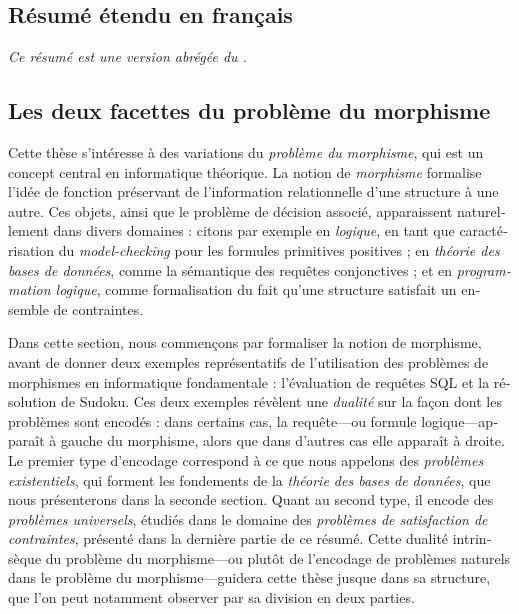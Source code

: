 \begin{french}

\chapter*{Résumé étendu en français}

\emph{Ce résumé est une version abrégée du .}

\section*{Les deux facettes du problème du morphisme}

Cette thèse s'intéresse à des variations du \emph{problème du morphisme}, qui est un concept 
central en informatique théorique. La notion de \emph{morphisme} formalise l'idée de fonction
préservant de l'information relationnelle d'une structure à une autre. Ces objets, ainsi que le
problème de décision associé, apparaissent naturellement dans divers domaines : citons par exemple
en \emph{logique}, en tant que caractérisation du \emph{model-checking} pour les formules 
primitives positives ; en \emph{théorie des bases de données}, comme la sémantique des requêtes 
conjonctives ; et en \emph{programmation logique}, comme formalisation du fait qu'une
structure satisfait un ensemble de contraintes.

Dans cette section, nous commençons par formaliser la notion de morphisme, avant
de donner deux exemples représentatifs de l'utilisation des problèmes de morphismes en informatique
fondamentale : l'évaluation de requêtes SQL et la résolution de Sudoku.
Ces deux exemples révèlent une \emph{dualité} sur la façon dont les problèmes sont encodés : dans
certains cas, la requête---ou formule logique---apparaît à gauche du morphisme, alors que dans d'autres cas elle apparaît à droite.
Le premier type d'encodage correspond à ce que nous appelons des \emph{problèmes existentiels},
qui forment les fondements de la \emph{théorie des bases de données}, que nous présenterons dans la seconde section. Quant au second type, il encode des \emph{problèmes universels}, étudiés
dans le domaine des \emph{problèmes de satisfaction de contraintes}, présenté dans la dernière partie de ce résumé. Cette dualité intrinsèque du problème du morphisme---ou plutôt de l'encodage
de problèmes naturels dans le problème du morphisme---guidera cette thèse jusque dans sa structure, que l'on peut notamment observer par sa division en deux parties.


\end{french}
